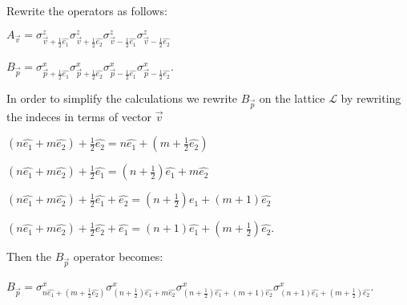 \documentclass{Configuration_Files/PoliMi3i_thesis}
\begin{document}
Rewrite the operators as follows: \newline

\begin{center}
	
	$A_{\vec{v}} = \sigma^z_{\vec{v}+\frac{1}{2}\hat{e_1}} \sigma^z_{\vec{v}+\frac{1}{2}\hat{e_2}} \sigma^z_{\vec{v}-\frac{1}{2}\hat{e_1}} \sigma^z_{\vec{v}-\frac{1}{2}\hat{e_2}}$ 
	
	$B_{\vec{p}} = \sigma^x_{\vec{p}+\frac{1}{2}\hat{e_1}} \sigma^x_{\vec{p}+\frac{1}{2}\hat{e_2}} \sigma^x_{\vec{p}-\frac{1}{2}\hat{e_1}} \sigma^x_{\vec{p}-\frac{1}{2}\hat{e_2}}$.
	
\end{center}

In order to simplify the calculations we rewrite $B_{\vec{p}}$ on the lattice $\mathcal{L}$ by rewriting the indeces in terms of vector $\vec{v}$ \newline

\begin{center}
	$(n\hat{e_1} + m\hat{e_2}) + \frac{1}{2}\hat{e_2}= n\hat{e_1} + (m+\frac{1}{2}\hat{e_2})$
	
	$(n\hat{e_1} + m\hat{e_2}) + \frac{1}{2}\hat{e_1}= (n+ \frac{1}{2})\hat{e_1} + m\hat{e_2}$
	
	$(n\hat{e_1} + m\hat{e_2}) + \frac{1}{2}\hat{e_1}+\hat{e_2}= (n+ \frac{1}{2})\hat{e_1} + (m + 1)\hat{e_2}$
	
	$(n\hat{e_1} + m\hat{e_2}) + \frac{1}{2}\hat{e_2}+\hat{e_1}= (n+ 1)\hat{e_1} + (m + \frac{1}{2})\hat{e_2}$.
\end{center}


Then the $B_{\vec{p}}$ operator becomes: \newline

\begin{center}
	
	$B_{\vec{p}} = \sigma^x_{n\hat{e_1} + (m+\frac{1}{2}\hat{e_2})} \sigma^x_{(n+ \frac{1}{2})\hat{e_1} + m\hat{e_2}} \sigma^x_{(n+ \frac{1}{2})\hat{e_1} + (m + 1)\hat{e_2}} \sigma^x_{(n+ 1)\hat{e_1} + (m + \frac{1}{2})\hat{e_2}}$. \newline
	
\end{center}


	
	
\end{document}
